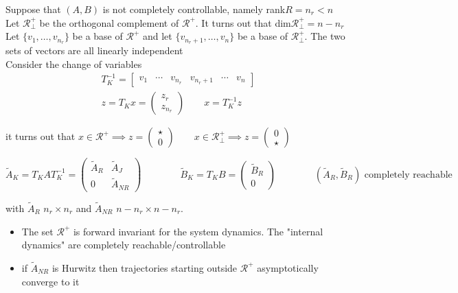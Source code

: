 \documentclass[english]{lectures}
\begin{document}
Suppose that $(A,B)$ is not completely controllable, namely rank$R=n_r<n$\\
Let $\mathcal{R}^+_{\perp}$ be the orthogonal complement of $\mathcal{R}^+$. It turns out that dim$\mathcal{R}^+_{\perp}=n-n_r$ \\
Let $\{v_1,\dots,v_{n_r}\}$ be a base of $\mathcal{R}^+$ and let $\{v_{n_r+1},\dots,v_n\}$ be a base of $\mathcal{R}^+_{\perp}$. The two sets of vectors are all linearly independent\\
Consider the change of variables \begin{gather*}
    T_K^{-1}=\begin{bmatrix}
    v_1 &  \cdots & v_{n_r} & v_{n_r+1} & \cdots & v_n
\end{bmatrix}\\
z=T_Kx=\begin{pmatrix}
    z_r \\ z_{n_r}
\end{pmatrix} \qquad x=T_K^{-1}z
\end{gather*}

it turns out that $x\in \mathcal{R}^+ \implies z= \begin{pmatrix}
    \star \\ 0
\end{pmatrix} \qquad x\in\mathcal{R}^+_{\perp} \implies z= \begin{pmatrix}
    0 \\ \star
\end{pmatrix}$ 
\begin{result}
\[
    \tilde{A}_K=T_KAT_K^{-1}=\begin{pmatrix}
        \tilde{A}_R & \tilde{A}_J\\
        0 & \tilde{A}_{NR}
    \end{pmatrix} \qquad \qquad \tilde{B}_K=T_KB=\begin{pmatrix}
        \tilde{B}_R \\ 0
    \end{pmatrix} \qquad \qquad (\tilde{A}_R,\tilde{B}_R) \text{ completely reachable}
\]
\end{result}
with  $\tilde{A}_R$ $n_r\times n_r$ and $\tilde{A}_{NR}$ $n-n_r \times n-n_r$.\\
\begin{itemize}
    \item The set $\mathcal{R}^+$ is forward invariant for the system dynamics. The "internal dynamics" are completely reachable/controllable
    \item if $\tilde{A}_{NR}$ is Hurwitz then trajectories starting outside $\mathcal{R}^+$ asymptotically converge to it
\end{itemize}
\end{document}
